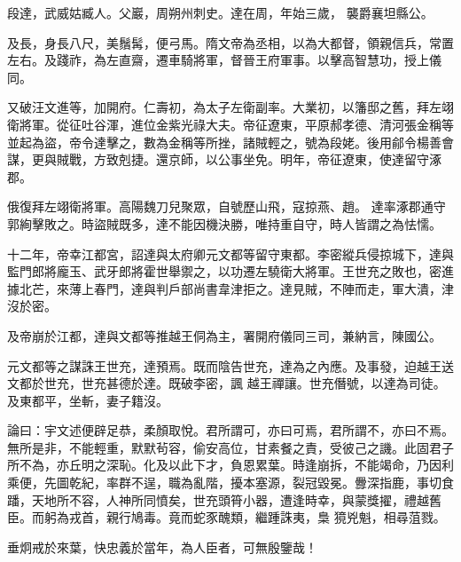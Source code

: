 \begin{pinyinscope}
 段達，武威姑臧人。父巖，周朔州刺史。達在周，年始三歲，
 襲爵襄坦縣公。



 及長，身長八尺，美鬚髯，便弓馬。隋文帝為丞相，以為大都督，領親信兵，常置左右。及踐祚，為左直齋，遷車騎將軍，督晉王府軍事。以擊高智慧功，授上儀同。



 又破汪文進等，加開府。仁壽初，為太子左衛副率。大業初，以籓邸之舊，拜左翊衛將軍。從征吐谷渾，進位金紫光祿大夫。帝征遼東，平原郝孝德、清河張金稱等並起為盜，帝令達擊之，數為金稱等所挫，諸賊輕之，號為段姥。後用鄃令楊善會謀，更與賊戰，方致剋捷。還京師，以公事坐免。明年，帝征遼東，使達留守涿郡。



 俄復拜左翊衛將軍。高陽魏刀兒聚眾，自號歷山飛，寇掠燕、趙。
 達率涿郡通守郭絢擊敗之。時盜賊既多，達不能因機決勝，唯持重自守，時人皆謂之為怯懦。



 十二年，帝幸江都宮，詔達與太府卿元文都等留守東都。李密縱兵侵掠城下，達與監門郎將龐玉、武牙郎將霍世舉禦之，以功遷左驍衛大將軍。王世充之敗也，密進據北芒，來薄上春門，達與判戶部尚書韋津拒之。達見賊，不陣而走，軍大潰，津沒於密。



 及帝崩於江都，達與文都等推越王侗為主，署開府儀同三司，兼納言，陳國公。



 元文都等之謀誅王世充，達預焉。既而陰告世充，達為之內應。及事發，迫越王送文都於世充，世充甚德於達。既破李密，諷
 越王禪讓。世充僭號，以達為司徒。及東都平，坐斬，妻子籍沒。



 論曰：宇文述便辟足恭，柔顏取悅。君所謂可，亦曰可焉，君所謂不，亦曰不焉。無所是非，不能輕重，默默茍容，偷安高位，甘素餐之責，受彼己之譏。此固君子所不為，亦丘明之深恥。化及以此下才，負恩累葉。時逢崩拆，不能竭命，乃因利乘便，先圖乾紀，率群不逞，職為亂階，擾本塞源，裂冠毀冕。釁深指鹿，事切食蹯，天地所不容，人神所同憤矣，世充頭筲小器，遭逢時幸，與蒙獎擢，禮越舊臣。而躬為戎首，親行鳩毒。竟而蛇豕醜類，繼踵誅夷，梟
 獍兇魁，相尋菹戮。



 垂炯戒於來葉，快忠義於當年，為人臣者，可無殷鑒哉！



\end{pinyinscope}